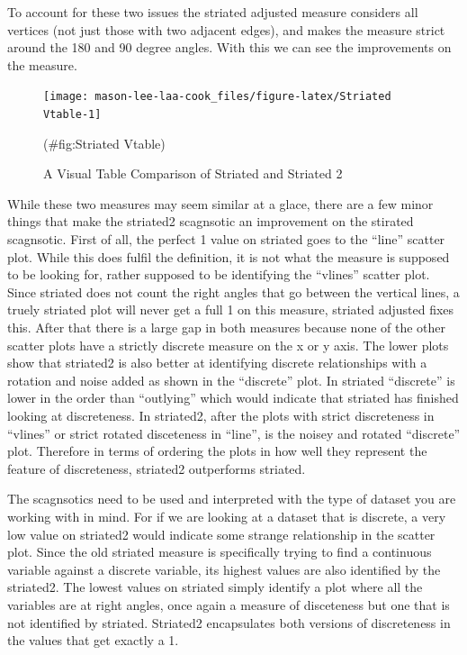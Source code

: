 To account for these two issues the striated adjusted measure considers
all vertices (not just those with two adjacent edges), and makes the
measure strict around the 180 and 90 degree angles. With this we can see
the improvements on the measure.

\begin{Schunk}
\begin{figure}
\texttt{[image: mason-lee-laa-cook\_files/figure-latex/Striated Vtable-1]} \caption[A Visual Table Comparison of Striated and Striated 2]{A Visual Table Comparison of Striated and Striated 2}(\#fig:Striated Vtable)
\end{figure}
\end{Schunk}

While these two measures may seem similar at a glace, there are a few
minor things that make the striated2 scagnsotic an improvement on the
stirated scagnsotic. First of all, the perfect 1 value on striated goes
to the ``line'' scatter plot. While this does fulfil the definition, it
is not what the measure is supposed to be looking for, rather supposed
to be identifying the ``vlines'' scatter plot. Since striated does not
count the right angles that go between the vertical lines, a truely
striated plot will never get a full 1 on this measure, striated adjusted
fixes this. After that there is a large gap in both measures because
none of the other scatter plots have a strictly discrete measure on the
x or y axis. The lower plots show that striated2 is also better at
identifying discrete relationships with a rotation and noise added as
shown in the ``discrete'' plot. In striated ``discrete'' is lower in the
order than ``outlying'' which would indicate that striated has finished
looking at discreteness. In striated2, after the plots with strict
discreteness in ``vlines'' or strict rotated disceteness in ``line'', is
the noisey and rotated ``discrete'' plot. Therefore in terms of ordering
the plots in how well they represent the feature of discreteness,
striated2 outperforms striated.

The scagnsotics need to be used and interpreted with the type of dataset
you are working with in mind. For if we are looking at a dataset that is
discrete, a very low value on striated2 would indicate some strange
relationship in the scatter plot. Since the old striated measure is
specifically trying to find a continuous variable against a discrete
variable, its highest values are also identified by the striated2. The
lowest values on striated simply identify a plot where all the variables
are at right angles, once again a measure of disceteness but one that is
not identified by striated. Striated2 encapsulates both versions of
discreteness in the values that get exactly a 1.

